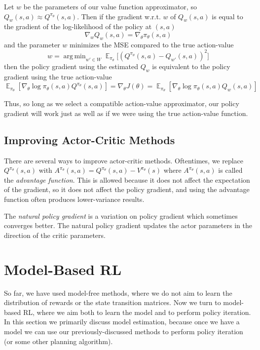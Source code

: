 \documentclass{article}
\DeclareMathOperator{\argmin}{arg\,min}
\DeclareMathOperator{\EX}{\mathbb{E}}
\newcommand{\ita}{\textit}
\begin{document}
Let $w$ be the parameters of our value function approximator, so $Q_w(s, a)\approx Q^{\pi_\theta}(s, a)$. Then if the gradient w.r.t. $w$ of $Q_w(s, a)$ is equal to the gradient of the log-likelihood of the policy at $(s, a)$
\begin{equation}
\nabla_w Q_w(s, a) = \nabla_\theta \pi_\theta(s, a)
\end{equation}
and the parameter $w$ minimizes the MSE compared to the true action-value
\begin{equation}\label{eq:w_minimizes_mse}
w = \argmin_{w'\in W} \EX_{\pi_\theta}\big[(Q^{\pi_\theta}(s, a) - Q_{w'}(s, a))^2\big]
\end{equation}
then the policy gradient using the estimated $Q_w$ is equivalent to the policy gradient using the true action-value
\begin{equation}\label{eq:policy_gradient_equivalence}
\EX_{\pi_\theta}[\nabla_\theta\log \pi_\theta(s, a)Q^{\pi_\theta}(s, a)]= \nabla_\theta J(\theta)=\EX_{\pi_\theta}[\nabla_\theta\log \pi_\theta(s, a)Q_w(s, a)]
\end{equation}

Thus, so long as we select a compatible action-value approximator, our policy gradient will work just as well as if we were using the true action-value function.

\subsection{Improving Actor-Critic Methods}

There are several ways to improve actor-critic methods. Oftentimes, we replace $Q^{\pi_\theta}(s, a)$ with $A^{\pi_\theta}(s, a)=Q^{\pi_\theta}(s, a) - V^{\pi_\theta}(s)$ where $A^{\pi_\theta}(s, a)$ is called the \ita{advantage function}. This is allowed because it does not affect the expectation of the gradient, so it does not affect the policy gradient, and using the advantage function often produces lower-variance results.

The \ita{natural policy gradient} is a variation on policy gradient which sometimes converges better. The natural policy gradient updates the actor parameters in the direction of the critic parameters.

\section{Model-Based RL}

So far, we have used model-free methods, where we do not aim to learn the distribution of rewards or the state transition matrices. Now we turn to model-based RL, where we aim both to learn the model and to perform policy iteration. In this section we primarily discuss model estimation, because once we have a model we can use our previously-discussed methods to perform policy iteration (or some other planning algorithm).
\end{document}
